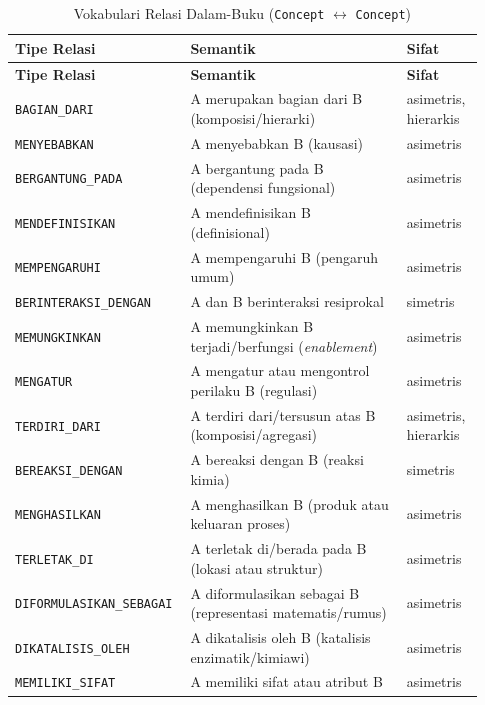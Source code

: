 \documentclass[main]{subfiles}
\begin{document}
\begin{longtable}{@{}p{0.32\linewidth}p{0.45\linewidth}p{0.16\linewidth}@{}}
  \caption{Vokabulari Relasi Dalam-Buku
    (\texttt{Concept} $\leftrightarrow$ \texttt{Concept})}
  \label{tab:relasi-dalam-buku}\\
  \toprule
  \textbf{Tipe Relasi} & \textbf{Semantik} & \textbf{Sifat} \\
  \midrule
  \endfirsthead
  \toprule
  \textbf{Tipe Relasi} & \textbf{Semantik} & \textbf{Sifat} \\
  \midrule
  \endhead
  \midrule
  \endfoot
  \bottomrule
  \endlastfoot
  \texttt{BAGIAN\_DARI}
    & A merupakan bagian dari B (komposisi/hierarki)
    & asimetris, hierarkis \\
  \texttt{MENYEBABKAN}
    & A menyebabkan B (kausasi)
    & asimetris \\
  \texttt{BERGANTUNG\_PADA}
    & A bergantung pada B (dependensi fungsional)
    & asimetris \\
  \texttt{MENDEFINISIKAN}
    & A mendefinisikan B (definisional)
    & asimetris \\
  \texttt{MEMPENGARUHI}
    & A mempengaruhi B (pengaruh umum)
    & asimetris \\
  \texttt{BERINTERAKSI\_DENGAN}
    & A dan B berinteraksi resiprokal
    & simetris \\
  \texttt{MEMUNGKINKAN}
    & A memungkinkan B terjadi/berfungsi (\textit{enablement})
    & asimetris \\
  \texttt{MENGATUR}
    & A mengatur atau mengontrol perilaku B (regulasi)
    & asimetris \\
  \texttt{TERDIRI\_DARI}
    & A terdiri dari/tersusun atas B (komposisi/agregasi)
    & asimetris, hierarkis \\
  \texttt{BEREAKSI\_DENGAN}
    & A bereaksi dengan B (reaksi kimia)
    & simetris \\
  \texttt{MENGHASILKAN}
    & A menghasilkan B (produk atau keluaran proses)
    & asimetris \\
  \texttt{TERLETAK\_DI}
    & A terletak di/berada pada B (lokasi atau struktur)
    & asimetris \\
  \texttt{DIFORMULASIKAN\_SEBAGAI}
    & A diformulasikan sebagai B (representasi matematis/rumus)
    & asimetris \\
  \texttt{DIKATALISIS\_OLEH}
    & A dikatalisis oleh B (katalisis enzimatik/kimiawi)
    & asimetris \\
  \texttt{MEMILIKI\_SIFAT}
    & A memiliki sifat atau atribut B
    & asimetris \\
\end{longtable}
\end{document}
